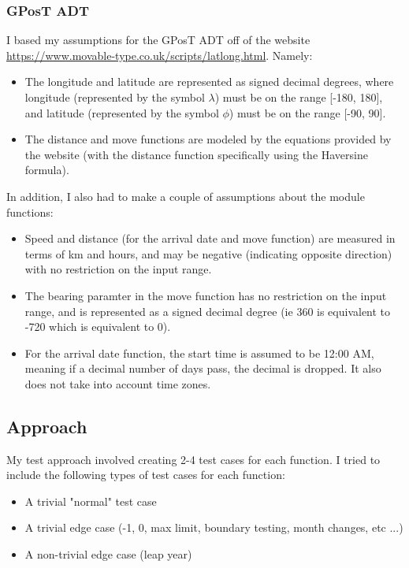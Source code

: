 \documentclass[12pt]{article}
\begin{document}
\subsubsection{GPosT ADT}
I based my assumptions for the GPosT ADT off of the website \url{https://www.movable-type.co.uk/scripts/latlong.html}. Namely:
\begin{itemize}
  \item The longitude and latitude are represented as signed decimal degrees, where longitude (represented by the symbol $\lambda$) must be on the range [-180, 180], and latitude (represented by the symbol $\phi$) must be on the range [-90, 90].
  \item The distance and move functions are modeled by the equations provided by the website (with the distance function specifically using the Haversine formula).
\end{itemize} 

In addition, I also had to make a couple of assumptions about the module functions:
\begin{itemize}
  \item Speed and distance (for the arrival date and move function) are measured in terms of km and hours, and may be negative (indicating opposite direction) with no restriction on the input range.
  \item The bearing paramter in the move function has no restriction on the input range, and is represented as a signed decimal degree (ie 360 is equivalent to -720 which is equivalent to 0).
  \item For the arrival date function, the start time is assumed to be 12:00 AM, meaning if a decimal number of days pass, the decimal is dropped. It also does not take into account time zones.
\end{itemize}

\subsection{Approach}
My test approach involved creating 2-4 test cases for each function. I tried to include the following types of test cases for each function:
\begin{itemize}
  \item A trivial "normal" test case
  \item A trivial edge case (-1, 0, max limit, boundary testing, month changes, etc ...)
  \item A non-trivial edge case (leap year)
\end{itemize}
\end{document}
